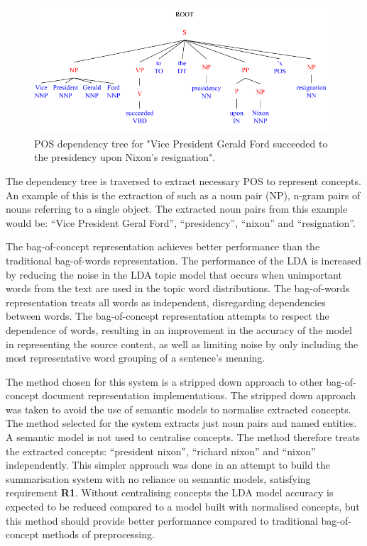 \begin{figure}[h]
    \centering
         \includegraphics[width=1.0\textwidth]{Figures/POS_TREE.png}
          \caption{POS dependency tree for "Vice President Gerald Ford succeeded to the presidency upon Nixon's resignation".}
           \label{pos}
\end{figure}

The dependency tree is traversed to extract necessary POS to represent concepts. An example of this is the extraction of such as a noun pair (NP), n-gram pairs of nouns referring to a single object. The extracted noun pairs from this example would be: “Vice President Geral Ford”, “presidency”, “nixon” and “resignation”.

The bag-of-concept representation achieves better performance than the traditional bag-of-words representation. The performance of the LDA is increased by reducing the noise in the LDA topic model that occurs when unimportant words from the text are used in the topic word distributions. The bag-of-words representation treats all words as independent, disregarding dependencies between words. The bag-of-concept representation attempts to respect the dependence of words, resulting in an improvement in the accuracy of the model in representing the source content, as well as limiting noise by only including the most representative word grouping of a sentence’s meaning.

The method chosen for this system is a stripped down approach to other bag-of-concept document representation implementations. The stripped down approach was taken to avoid the use of semantic models to normalise extracted concepts. The method selected for the system extracts just noun pairs and named entities. A semantic model is not used to centralise concepts. The method therefore treats the extracted concepts: “president nixon”, “richard nixon” and “nixon” independently. This simpler approach was done in an attempt to build the summarisation system with no reliance on semantic models, satisfying requirement \textbf{R1}. Without centralising concepts the LDA model accuracy is expected to be reduced compared to a model built with normalised concepts, but this method should provide better performance compared to traditional bag-of-concept methods of preprocessing. 

